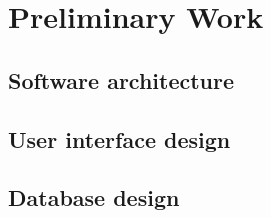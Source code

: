 \chapter{Preliminary Work}
\label{chap:preliminary-work}

\section{Software architecture}

\section{User interface design}

\section{Database design}